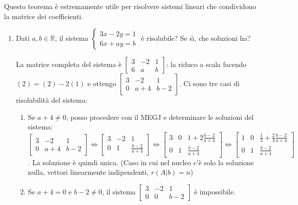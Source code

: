 \documentclass{article}
\begin{document}
Questo teorema \`{e} estremamente utile per risolvere sistemi lineari che
condividono la matrice dei coefficienti.

\begin{enumerate}
\item Dati $a,b\in 
\mathbb{R}
$, il sistema $\left\{ 
\begin{array}{c}
3x-2y=1 \\ 
6x+ay=b%
\end{array}%
\right. $ \`{e} risolubile? Se s\`{\i}, che soluzioni ha?

La matrice completa del sistema \`{e} $\left[ 
\begin{array}{ccc}
3 & -2 & 1 \\ 
6 & a & b%
\end{array}%
\right] $: la riduco a scala facendo $\left( 2\right) =\left( 2\right)
-2\left( 1\right) $ e ottengo $\left[ 
\begin{array}{ccc}
3 & -2 & 1 \\ 
0 & a+4 & b-2%
\end{array}%
\right] $. Ci sono tre casi di risolubilit\`{a} del sistema:

\begin{enumerate}
\item Se $a+4\neq 0$, posso procedere con il MEGJ e determinare le soluzioni
del sistema: $\left[ 
\begin{array}{ccc}
3 & -2 & 1 \\ 
0 & a+4 & b-2%
\end{array}%
\right] \Longleftrightarrow \left[ 
\begin{array}{ccc}
3 & -2 & 1 \\ 
0 & 1 & \frac{b-2}{a+4}%
\end{array}%
\right] \Longleftrightarrow \left[ 
\begin{array}{ccc}
3 & 0 & 1+2\frac{b-2}{a+4} \\ 
0 & 1 & \frac{b-2}{a+4}%
\end{array}%
\right] \Longleftrightarrow \left[ 
\begin{array}{ccc}
1 & 0 & \frac{1}{3}+\frac{2}{3}\frac{b-2}{a+4} \\ 
0 & 1 & \frac{b-2}{a+4}%
\end{array}%
\right] $. La soluzione \`{e} quindi unica. (Caso in cui nel nucleo c'\`{e}
solo la soluzione nulla, vettori linearmente indipendenti, $r\left(
A|b\right) =n$)

\item Se $a+4=0$ e $b-2\neq 0$, il sistema $\left[ 
\begin{array}{ccc}
3 & -2 & 1 \\ 
0 & 0 & b-2%
\end{array}%
\right] $ \`{e} impossibile.


\end{enumerate}
\end{enumerate}
\end{document}

